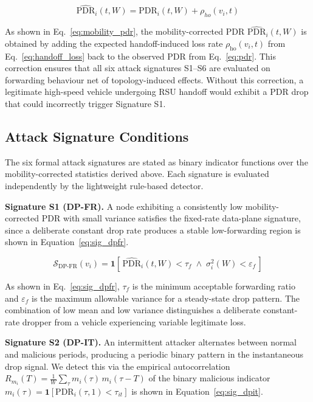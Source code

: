 \documentclass[12pt, a4paper]{report}
\begin{document}
\begin{equation}
\label{eq:mobility_pdr}
\widehat{\text{PDR}}_i(t, W) = \text{PDR}_i(t, W) + \rho_{ho}(v_i, t)
\end{equation}

As shown in Eq.~\eqref{eq:mobility_pdr}, the mobility-corrected PDR $\widehat{\text{PDR}}_i(t, W)$ is obtained by adding the expected handoff-induced loss rate $\rho_{\text{ho}}(v_i, t)$ from Eq.~\eqref{eq:handoff_loss} back to the observed PDR from Eq.~\eqref{eq:pdr}. This correction ensures that all six attack signatures S1--S6 are evaluated on forwarding behaviour net of topology-induced effects. Without this correction, a legitimate high-speed vehicle undergoing RSU handoff would exhibit a PDR drop that could incorrectly trigger Signature S1.

\subsection{Attack Signature Conditions}
\label{sec:signatures}

The six formal attack signatures are stated as binary indicator functions
over the mobility-corrected statistics derived above. Each signature is
evaluated independently by the lightweight rule-based detector.

\textbf{Signature S1 (DP-FR).} A node exhibiting a consistently low
mobility-corrected PDR with small variance satisfies the fixed-rate data-plane
signature, since a deliberate constant drop rate produces a stable
low-forwarding region is shown in Equation~\eqref{eq:sig_dpfr}.

\begin{equation}
\label{eq:sig_dpfr}
\mathcal{S}_{\text{DP-FR}}(v_i) =
\mathbf{1}\!\left[\,
\widehat{\text{PDR}}_i(t, W) < \tau_f \;\wedge\;
\sigma^2_i(W) < \varepsilon_f
\,\right]
\end{equation}

As shown in Eq.~\eqref{eq:sig_dpfr}, $\tau_f$ is the minimum 
acceptable forwarding ratio and $\varepsilon_f$ is the maximum 
allowable variance for a steady-state drop pattern. The combination 
of low mean and low variance distinguishes a deliberate constant-rate 
dropper from a vehicle experiencing variable legitimate loss.

\textbf{Signature S2 (DP-IT).} An intermittent attacker alternates between
normal and malicious periods, producing a periodic binary pattern in the
instantaneous drop signal. We detect this via the empirical autocorrelation
$R_{m_i}(T) = \frac{1}{W}\sum_\tau m_i(\tau)\,m_i(\tau{-}T)$ of the binary
malicious indicator $m_i(\tau)=\mathbf{1}[\text{PDR}_i(\tau,1)<\tau_{it}]$ is shown in Equation~\eqref{eq:sig_dpit}.
\end{document}
